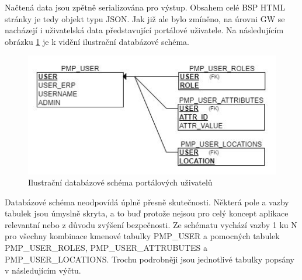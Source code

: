 \documentclass[thesis=M,czech]{FITthesis}[2012/06/26]
\begin{document}
Načtená data jsou zpětně serializována pro výstup. Obsahem celé BSP HTML stránky je tedy objekt typu JSON. Jak již ale bylo zmíněno, na úrovni GW se nacházejí i uživatelská data představující portálové uživatele. Na následujícím obrázku \ref{img:gw_db} je k vidění ilustrační databázové schéma. 

\begin{figure}[H]
	\centering
	\includegraphics[]{images/gw_db}
	\caption{Ilustrační databázové schéma portálových uživatelů}
	\label{img:gw_db}
\end{figure}

Databázové schéma neodpovídá úplně přesně skutečnosti. Některá pole a vazby tabulek jsou úmyslně skryta, a to buď protože nejsou pro celý koncept aplikace relevantní nebo z důvodu zvýšení bezpečnosti. Ze schématu vychází vazby 1 ku N pro všechny kombinace kmenové tabulky PMP\_USER a pomocných tabulek PMP\_USER\_ROLES, PMP\_USER\_ATTRUBUTES a PMP\_USER\_LOCATIONS. Trochu podrobněji jsou jednotlivé tabulky popsány v následujícím výčtu.
\end{document}
